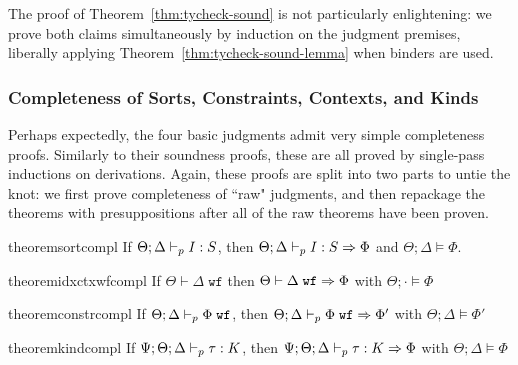 The proof of Theorem~\ref{thm:tycheck-sound} is not particularly enlightening: we prove both claims simultaneously by induction on the judgment premises, liberally applying Theorem~\ref{thm:tycheck-sound-lemma} when binders are used.


\subsubsection{Completeness of Sorts, Constraints, Contexts, and Kinds}
Perhaps expectedly, the four basic judgments admit very simple completeness proofs. Similarly to their soundness proofs, these are all proved by single-pass inductions on derivations. Again, these proofs are split into two parts to untie the knot: we first prove completeness of ``raw" judgments, and then repackage the theorems with presuppositions after all of the raw theorems have been proven.


\begin{restatable}{theorem}{sortcompl}
If $\Theta;\Delta \vdash_p I : S$, then $\Theta;\Delta \vdash_p I : S \Rightarrow \Phi$ and $\Theta;\Delta \vDash \Phi$.
\label{thm:sort-compl}
\end{restatable}

\begin{restatable}{theorem}{idxctxwfcompl}
If $\Theta \vdash \Delta \; \texttt{wf}$ then $\Theta \vdash \Delta \; \texttt{wf} \Rightarrow \Phi$ with $\Theta ; \cdot \vDash \Phi$
\label{thm:idx-ctx-wf-compl}
\end{restatable}

\begin{restatable}{theorem}{constrcompl}
If $\Theta ; \Delta \vdash_p \Phi \; \texttt{wf}$, then $\Theta ; \Delta \vdash_p \Phi \; \texttt{wf} \Rightarrow \Phi'$ with $\Theta ; \Delta \vDash \Phi'$
\label{thm:constr-compl}
\end{restatable}

\begin{restatable}{theorem}{kindcompl}
If $\Psi;\Theta;\Delta \vdash_p \tau : K$, then $\Psi;\Theta;\Delta \vdash_p \tau : K \Rightarrow \Phi$ with $\Theta ; \Delta \vDash \Phi$
\label{thm:kind-compl}
\end{restatable}

